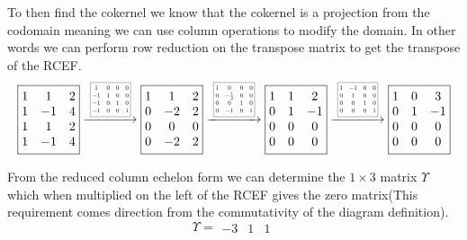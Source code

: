 \documentclass[12pt]{amsart}
\theoremstyle{definition}
\newcommand{\R}{\mathbb{R}}
\DeclareMathOperator{\coker}{\mathrm{coker}}
\newcommand{\ra}{\rightarrow}
\begin{document}
\begin{enumerate}[start=0]
To then find the cokernel we know that the cokernel is a projection from the codomain meaning we can use column operations to modify the domain. In other words we can perform row reduction on the transpose matrix to get the transpose of the RCEF.
$$\boxed{\begin{matrix}
1 & 1 & 2\\
1 & -1 & 4\\
1 & 1 & 2\\
1 & -1 & 4
\end{matrix}}\xrightarrow{\scalebox{0.5}{\;
\boxed{\begin{matrix}
    1 &0& 0&0\\
    -1& 1 & 0&0\\
    -1 & 0 & 1&0\\
    -1&0&0&1
\end{matrix}}\;}}
\boxed{\begin{matrix}
1 & 1 & 2\\
0 & -2 & 2\\
0 & 0 & 0\\
0 & -2 & 2
\end{matrix}}
\xrightarrow{\scalebox{0.5}{\;
\boxed{\begin{matrix}
    1 & 0 & 0 & 0\\
    0 & -\frac{1}{2} & 0 & 0\\
    0 & 0 & 1 & 0\\
    0 & -1 & 0 & 1
\end{matrix}}\;}}
\boxed{\begin{matrix}
1 & 1 & 2\\
0 & 1 & -1\\
0 & 0 & 0\\
0 & 0 & 0
\end{matrix}}
\xrightarrow{\scalebox{0.5}{\;
\boxed{\begin{matrix}
    1 & -1 & 0 & 0\\
    0 & 1 & 0 & 0\\
    0 & 0 & 1 & 0\\
    0 & 0 & 0 & 1
\end{matrix}}\;}}
\boxed{\begin{matrix}
1 & 0 & 3\\
0 & 1 & -1\\
0 & 0 & 0\\
0 & 0 & 0
\end{matrix}}$$

From the reduced column echelon form we can determine the $1\times 3$ matrix $\Upsilon$ which when multiplied on the left of the RCEF gives the zero matrix(This requirement comes direction from the commutativity of the diagram definition).
$$\Upsilon=\boxed{\begin{matrix}
-3 & 1 & 1
\end{matrix}}$$\\


\end{enumerate}
\end{document}
